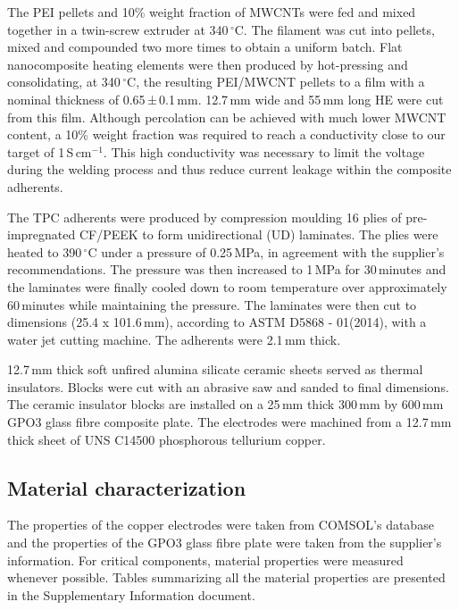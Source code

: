 \documentclass[review,times,sagev,doublespace]{sagej}
\begin{document}
The PEI pellets and 10\% weight fraction of MWCNTs were fed and mixed together in a twin-screw extruder at 340\,$^{\circ}$C. 
The filament was cut into pellets, mixed and compounded two more times to obtain a uniform batch. 
Flat nanocomposite heating elements were then produced by hot-pressing { and consolidating, at 340\,$^{\circ}$C,} the resulting PEI/MWCNT pellets to a film with a { nominal} thickness of \mbox{0.65{\,±\,0.1}\,mm}. 
\mbox{12.7\,mm} wide and \mbox{55\,mm} long HE were cut from this film. 
{ Although percolation can be achieved with much lower MWCNT content, a 10\% weight fraction was required to reach a conductivity close to our target of \mbox{1\,S\,cm$^{-1}$}. 
This high conductivity was necessary to limit the voltage during the welding process and thus reduce current leakage within the composite adherents. }

The TPC adherents were produced by compression moulding 16 plies of pre-impregnated CF/PEEK to form unidirectional (UD) laminates. 
The plies were heated to 390\,$^{\circ}$C under a pressure of 0.25\,MPa, in agreement with the supplier’s recommendations. 
The pressure was then increased to 1\,MPa for 30\,minutes and the laminates were finally cooled down to room temperature over approximately 60\,minutes while maintaining the pressure. 
The laminates were then cut to dimensions (25.4 x \mbox{101.6\,mm}), according to ASTM D5868 - 01(2014), with a water jet cutting machine. 
The adherents were \mbox{2.1\,mm} thick. 

\mbox{12.7\,mm} thick soft unfired alumina silicate ceramic sheets served as thermal insulators. 
Blocks were cut with an abrasive saw and sanded to final dimensions. 
The ceramic insulator blocks are installed on a \mbox{25\,mm} thick \mbox{300\,mm} by \mbox{600\,mm} GPO3 glass fibre composite plate. 
The electrodes were machined from a \mbox{12.7\,mm} thick sheet of UNS C14500 phosphorous tellurium copper. 

	\subsection{Material characterization}

The properties of the copper electrodes were taken from COMSOL’s database and the properties of the GPO3 glass fibre plate were taken from the supplier’s information. 
For critical components, material properties were measured whenever possible. 
Tables summarizing all the material properties are presented in the Supplementary Information document. 
\end{document}
